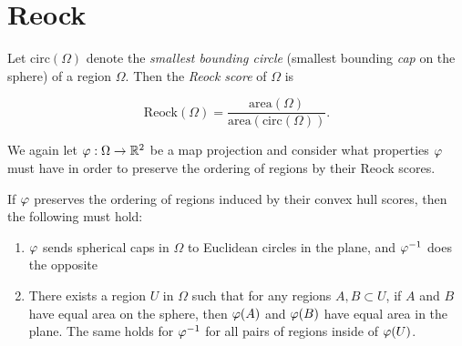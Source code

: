 \section{Reock}\label{sec:reock}

Let $\mathrm{circ}(\Omega)$ denote the \textit{smallest bounding
circle} (smallest bounding \textit{cap} on the sphere) of a region
$\Omega$.  Then the \textit{Reock score} of $\Omega$ is 

$$\mathrm{Reock}(\Omega)=
\frac{\mathrm{area}(\Omega)}{\mathrm{area}(\mathrm{circ}(\Omega))}.$$

We again let $\varphi:\Omega\rightarrow \mathbb{R}^2$  be a map projection and consider what properties $\varphi$ must have in order to preserve the ordering of regions by their Reock scores.  

\begin{lemma}\label{lem:reock_prep}
  If $\varphi$ preserves the ordering of regions induced by their convex hull scores, then the following must hold:
  \begin{enumerate}
    \item $\varphi$ sends spherical caps in $\Omega$ to Euclidean circles in the plane,  and $\varphi^{-1}$ does the opposite 
    \item There exists a region $U$ in $\Omega$ such that for any regions $A,B\subset U$, if $A$ and $B$ have equal area on the sphere, then $\varphi(A)$ and $\varphi(B)$ have equal area in the plane.  The same holds for $\varphi^{-1}$ for all pairs of regions inside of $\varphi(U)$.
  \end{enumerate}
\end{lemma}
